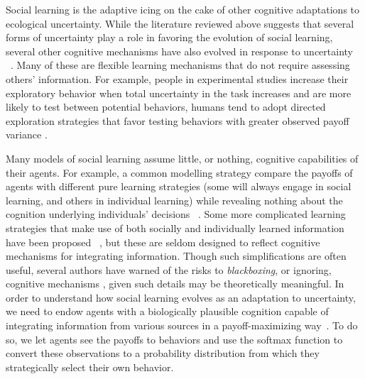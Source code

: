 \documentclass[letterpaper,11.5pt]{scrartcl}
\newcommand{\cm}[1]{{\textcolor{mypurple} {({\tiny CM:} #1)}}}
\newcommand{\ps}[1]{{\textcolor{mygreen} {({\tiny PS:} #1)}}}
\begin{document}
Social learning is the adaptive icing on the cake of other cognitive adaptations
to ecological uncertainty.  While the literature reviewed above suggests that
several forms of uncertainty play a role in favoring the evolution of social
learning, several other cognitive mechanisms have also evolved in response to
uncertainty ~\cite{volz2012}. Many of these are flexible learning mechanisms that
do not require assessing others' information. For example, people in experimental
studies increase their exploratory behavior when total uncertainty in the task
increases and are more likely to test %
between potential behaviors, humans tend to adopt directed exploration strategies
that favor testing behaviors with greater observed payoff variance
\cite{Wilson2014,Gershman2019}.

Many models of social learning assume little, or nothing, cognitive capabilities
of their agents. For example, a common modelling strategy compare the payoffs of
agents with different pure learning strategies (some will always engage in social
learning, and others in individual learning) while revealing nothing about the
cognition underlying individuals' decisions  ~\cite{BoydRicherson1985, Rogers1988,
aoki2005}. Some more complicated learning strategies that make use of both
socially and individually learned information have been proposed
~\cite{Enquist2007, perreault2012bayesian}, but these are seldom designed to
reflect cognitive mechanisms for integrating information. Though such
simplifications are often useful, several authors have warned of the risks to
\emph{blackboxing}, or ignoring, cognitive mechanisms \cite[p. 658]{Heyes2016,
Kendal2018}, given such details may be theoretically meaningful. In order to
understand how social learning evolves as an adaptation to uncertainty, we need to
endow agents with a biologically plausible cognition capable of integrating
information from various sources in a payoff-maximizing way~\cite{Gershman2019}. 
To do so, we let
agents see the payoffs to behaviors and use the softmax function to convert these
observations to a probability distribution from which they strategically select
their own behavior. %

\end{document}
